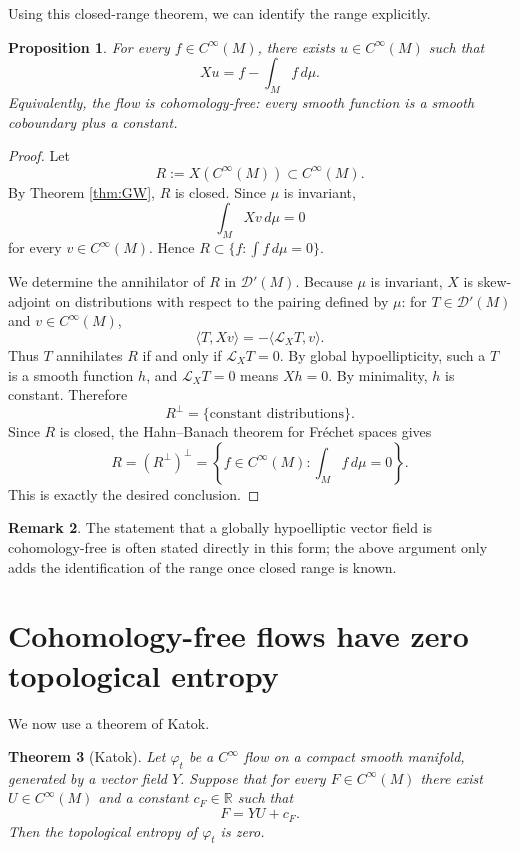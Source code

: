 \documentclass[11pt]{article}
\newtheorem{theorem}{Theorem}[section]
\newtheorem{proposition}[theorem]{Proposition}
\theoremstyle{definition}
\newtheorem{remark}[theorem]{Remark}
\begin{document}
Using this closed-range theorem, we can identify the range explicitly.

\begin{proposition}\label{prop:cohomology-free}
For every \(f\in C^\infty(M)\), there exists \(u\in C^\infty(M)\) such that
\[
Xu=f-\int_M f\,d\mu.
\]
Equivalently, the flow is \emph{cohomology-free}: every smooth function is a smooth coboundary plus a constant.
\end{proposition}

\begin{proof}
Let
\[
R:=X(C^\infty(M))\subset C^\infty(M).
\]
By Theorem \ref{thm:GW}, \(R\) is closed. Since \(\mu\) is invariant,
\[
\int_M Xv\,d\mu=0
\]
for every \(v\in C^\infty(M)\). Hence \(R\subset \{f:\int f\,d\mu=0\}\).

We determine the annihilator of \(R\) in \(\mathcal D'(M)\). Because \(\mu\) is invariant, \(X\) is skew-adjoint on distributions with respect to the pairing defined by \(\mu\): for \(T\in\mathcal D'(M)\) and \(v\in C^\infty(M)\),
\[
\langle T,Xv\rangle=-\langle \mathcal L_XT,v\rangle.
\]
Thus \(T\) annihilates \(R\) if and only if \(\mathcal L_XT=0\). By global hypoellipticity, such a \(T\) is a smooth function \(h\), and \(\mathcal L_XT=0\) means \(Xh=0\). By minimality, \(h\) is constant. Therefore
\[
R^\perp=\{\text{constant distributions}\}.
\]
Since \(R\) is closed, the Hahn--Banach theorem for Fr\'echet spaces gives
\[
R=(R^\perp)^\perp
=
\left\{f\in C^\infty(M):\int_M f\,d\mu=0\right\}.
\]
This is exactly the desired conclusion.
\end{proof}

\begin{remark}
The statement that a globally hypoelliptic vector field is cohomology-free is often stated directly in this form; the above argument only adds the identification of the range once closed range is known.
\end{remark}

\section{Cohomology-free flows have zero topological entropy}

We now use a theorem of Katok.

\begin{theorem}[Katok]\label{thm:Katok}
Let \(\varphi_t\) be a \(C^\infty\) flow on a compact smooth manifold, generated by a vector field \(Y\). Suppose that for every \(F\in C^\infty(M)\) there exist \(U\in C^\infty(M)\) and a constant \(c_F\in\mathbb R\) such that
\[
F=YU+c_F.
\]
Then the topological entropy of \(\varphi_t\) is zero.
\end{theorem}
\end{document}
